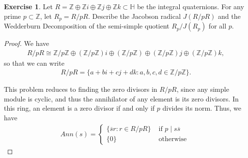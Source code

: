\documentclass[12pt]{extarticle}
\newcommand{\set}[1]{\{#1\}}
\newcommand{\Z}{\mathbb{Z}}
\newcommand{\<}{\langle}
\renewcommand{\>}{\rangle}
\theoremstyle{definition}
\newtheorem{exercise}{Exercise}
\begin{document}
\begin{exercise}
  Let $R = \Z \oplus \Z i \oplus \Z j \oplus \Z k \subset \mathbb{H}$ be the integral quaternions. For any prime $p \subset \Z$, let $R_p = R / pR$.
  Describe the Jacobson radical $J(R/pR)$ and the Wedderburn Decomposition of the semi-simple quotient $R_p/J(R_p)$ for all $p$. 
\end{exercise}
\begin{proof}
  We have
  \begin{align*}
    R/pR \cong \Z/p\Z \oplus (\Z/p\Z)i \oplus (\Z/p\Z) \oplus (\Z/p\Z)j \oplus (\Z/p\Z) k, 
  \end{align*}
  so that we can write
  \begin{align*}
    R/pR = \set{a+bi+cj+dk : a,b,c,d \in \Z/p\Z}.
  \end{align*}

  This problem reduces to finding the zero divisors in $R/pR$, since any
  simple module is cyclic, and thus the annihilator of any element is its zero divisors. In this ring, an element is a zero divisor if and only if $p$ divides its norm. Thus, we have
  \begin{align*}
    Ann(s) =
    \begin{cases}
      \set{\overline{s}r: r \in R/pR} & \text{ if } p \mid s \overline{s}  \\
      \set{0} & \text { otherwise } 
    \end{cases}
  \end{align*}

  
  
\end{proof}
\end{document}
